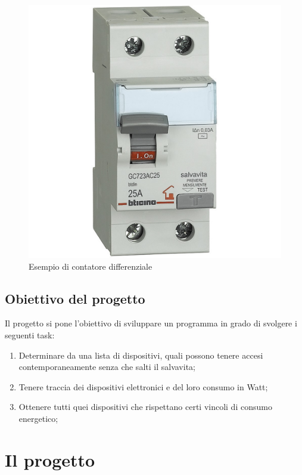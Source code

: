 \documentclass[12pt, letterpaper]{article}
\begin{document}
\begin{figure}[h]
      \centering
      \includegraphics[scale=0.2]{interruttore-diff.jpg}
      \caption{Esempio di contatore differenziale}
\end{figure}


\subsection{Obiettivo del progetto}

Il progetto si pone l'obiettivo di sviluppare un programma in grado di svolgere
i seguenti task:

\begin{enumerate}
      \item Determinare da una lista di dispositivi, quali possono tenere accesi contemporaneamente
            senza che salti il salvavita;
      \item Tenere traccia dei dispositivi elettronici e del loro consumo in Watt;
      \item Ottenere tutti quei dispositivi che rispettano certi vincoli di consumo energetico;
\end{enumerate}

\section{Il progetto}
\end{document}
